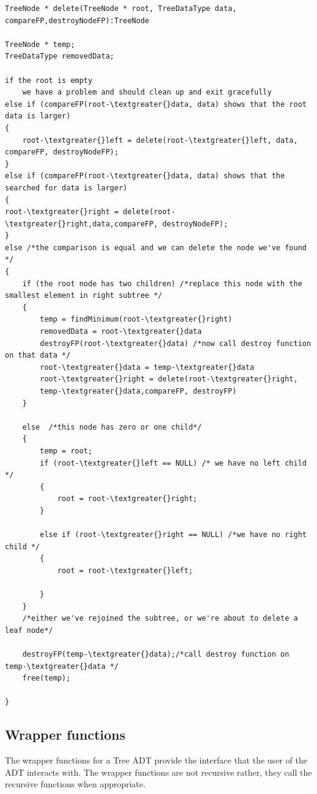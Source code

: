 \begin{lstlisting}
TreeNode * delete(TreeNode * root, TreeDataType data, compareFP,destroyNodeFP):TreeNode

TreeNode * temp;
TreeDataType removedData;

if the root is empty
	we have a problem and should clean up and exit gracefully
else if (compareFP(root-\textgreater{}data, data) shows that the root data is larger)
{
	root-\textgreater{}left = delete(root-\textgreater{}left, data, compareFP, destroyNodeFP);
}
else if (compareFP(root-\textgreater{}data, data) shows that the searched for data is larger)
{
root-\textgreater{}right = delete(root-\textgreater{}right,data,compareFP, destroyNodeFP);
}
else /*the comparison is equal and we can delete the node we've found */
{
	if (the root node has two children) /*replace this node with the smallest element in right subtree */
	{
		temp = findMinimum(root-\textgreater{}right)
		removedData = root-\textgreater{}data
		destroyFP(root-\textgreater{}data) /*now call destroy function on that data */
		root-\textgreater{}data = temp-\textgreater{}data
		root-\textgreater{}right = delete(root-\textgreater{}right,
		temp-\textgreater{}data,compareFP, destroyFP)
	}

	else  /*this node has zero or one child*/
	{
		temp = root;
		if (root-\textgreater{}left == NULL) /* we have no left child */
		{
			root = root-\textgreater{}right;
		}

		else if (root-\textgreater{}right == NULL) /*we have no right child */
		{
			root = root-\textgreater{}left;

		}
	}
	/*either we've rejoined the subtree, or we're about to delete a leaf node*/

	destroyFP(temp-\textgreater{}data);/*call destroy function on temp-\textgreater{}data */
	free(temp);

}
\end{lstlisting}
\subsection{Wrapper functions}

The wrapper functions for a Tree ADT provide the interface that the user
of the ADT interacts with.
The wrapper functions are not recursive rather, they call the recursive
functions when appropriate.

